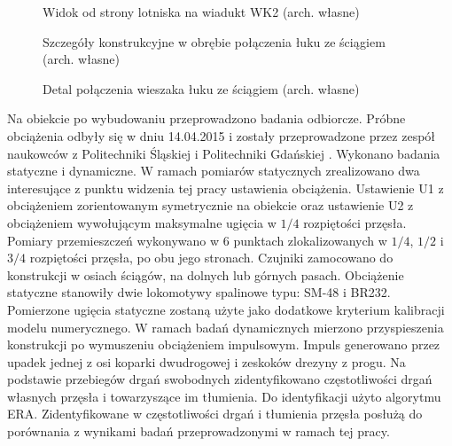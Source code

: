 \begin{figure}[hbt!]
	\centering
	\captionsetup{justification=centering}
	\caption{Widok od strony lotniska na wiadukt WK2 (arch. własne)}
	\label{fig: wk2_foto_widok_front}
\end{figure}
\begin{figure}[hbt!]
	\centering
	\qquad
	\captionsetup{justification=centering}
	\caption{Szczegóły konstrukcyjne w obrębie połączenia łuku ze ściągiem (arch. własne)}
	\label{fig: wk2_foto_wezglowie}
\end{figure}
\begin{figure}[hbt!]
	\centering
	\captionsetup{justification=centering}
	\caption{Detal połączenia wieszaka łuku ze ściągiem (arch. własne)}
	\label{fig: wk2_foto_wieszak}
\end{figure}
Na obiekcie po wybudowaniu przeprowadzono badania odbiorcze. Próbne obciążenia odbyły się w dniu 14.04.2015 i zostały przeprowadzone przez zespół naukowców z Politechniki Śląskiej i Politechniki Gdańskiej \parencite{azinski2015}. Wykonano badania statyczne i dynamiczne. W ramach pomiarów statycznych zrealizowano dwa interesujące z punktu widzenia tej pracy ustawienia obciążenia. Ustawienie U1 z obciążeniem zorientowanym symetrycznie na obiekcie oraz ustawienie U2 z obciążeniem wywołującym maksymalne ugięcia w $1/4$ rozpiętości przęsła. Pomiary przemieszczeń wykonywano w 6 punktach zlokalizowanych w $1/4$, $1/2$ i $3/4$ rozpiętości przęsła, po obu jego stronach. Czujniki zamocowano do konstrukcji w osiach ściągów, na dolnych lub górnych pasach. Obciążenie statyczne stanowiły dwie lokomotywy spalinowe typu: SM-48 i BR232. Pomierzone ugięcia statyczne zostaną użyte jako dodatkowe kryterium kalibracji modelu numerycznego.
W ramach badań dynamicznych mierzono przyspieszenia konstrukcji po wymuszeniu obciążeniem impulsowym. Impuls generowano przez upadek jednej z osi koparki dwudrogowej i zeskoków drezyny z progu. Na podstawie przebiegów drgań swobodnych zidentyfikowano częstotliwości drgań własnych przęsła i towarzyszące im tłumienia. Do identyfikacji użyto algorytmu ERA. Zidentyfikowane w \parencite{azinski2015} częstotliwości drgań i tłumienia przęsła posłużą do porównania z wynikami badań przeprowadzonymi w ramach tej pracy.


